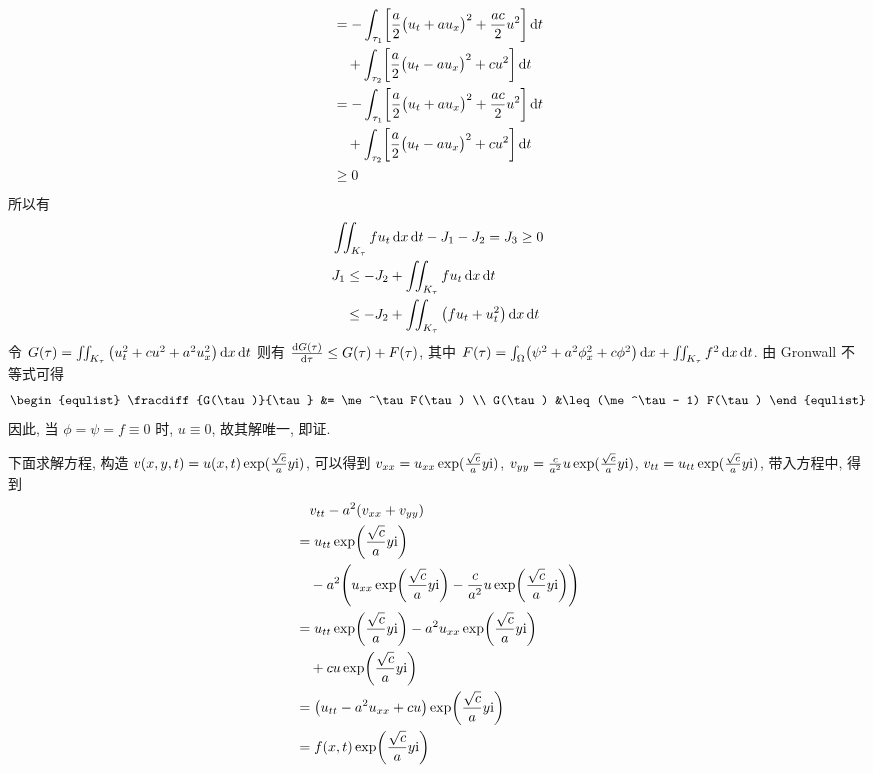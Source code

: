 \begin{solution}
\begin{align*}
&= -\int_{\tau_1} \biggl[ \frac{a}{2}
    \bigl( u_t + a u_x \bigr)^2 + \frac{ac}{2}u^2 \biggr] \operatorname{d\!} t \\
    &\quad+ \int_{\tau_2} \biggl[ \frac{a}{2}
        \bigl( u_t - a u_x \bigr)^2 + cu^2 \biggr] \operatorname{d\!} t \\
&= -\int_{\tau_1} \biggl[ \frac{a}{2}
    \bigl( u_t + a u_x \bigr)^2 + \frac{ac}{2}u^2 \biggr] \operatorname{d\!} t \\
    &\quad+ \int_{\tau_2} \biggl[ \frac{a}{2}
        \bigl( u_t - a u_x \bigr)^2 + cu^2 \biggr] \operatorname{d\!} t \\
&\geq 0
\end{align*}
所以有
\begin{align*}
& \iint_{K_\tau} f u_t \operatorname{d\!} x \operatorname{d\!} t - J_1 - J_2 = J_3 \geq 0 \\
& J_1 \leq -J_2 + \iint_{K_\tau} f u_t \operatorname{d\!} x \operatorname{d\!} t \\
&\quad\leq -J_2 + \iint_{K_\tau} {\left( {f u_t + u_t^2} \right)} \operatorname{d\!} x \operatorname{d\!} t
\end{align*}
令 $G(\tau) = \iint_{K_\tau}{\left( {u_t^2 + c u^2 + a^2 u_x^2} \right)}\operatorname{d\!} x\operatorname{d\!} t$
则有 ${\frac{\operatorname{d\!} {G(\tau)}}{\operatorname{d\!} {\tau}}} \leq G(\tau) + F(\tau)$, 其中
$F(\tau) = \int_\Omega \bigl( \psi^2 + a^2 \phi_x^2 + c\phi^2 \bigr) \operatorname{d\!} x
+\iint_{K_\tau} f^2 \operatorname{d\!} x \operatorname{d\!} t$.
由 Gronwall 不等式可得
\[ \begin{equlist}
\fracdiff{G(\tau)}{\tau} &= \me^\tau F(\tau) \\
    G(\tau) &\leq (\me^\tau - 1) F(\tau)
\end{equlist} \]
因此, 当 $\phi = \psi = f \equiv 0$ 时, $u \equiv 0$, 故其解唯一, 即证.

下面求解方程, 构造 $v(x, y, t) = u(x, t) \* \exp(\frac{\sqrt{c}}{a}y\mi)$,
可以得到 $v_{xx} = u_{xx} \* \exp(\frac{\sqrt{c}}{a}y\mi)$,
$v_{yy} = \frac{c}{a^2} u \* \exp(\frac{\sqrt{c}}{a}y\mi)$,
$v_{tt} = u_{tt} \* \exp(\frac{\sqrt{c}}{a}y\mi)$, 带入方程中, 得到
\begin{align*}
&\quad v_{tt} - a^2 (v_{xx} + v_{yy}) \\
&= u_{tt} \* \exp\biggl(\frac{\sqrt{c}}{a}y\mi\biggr) \\
    &\quad- a^2 \Biggl(
        u_{xx} \* \exp\biggl(\frac{\sqrt{c}}{a}y\mi\biggr)
        - \frac{c}{a^2} \* u \* \exp\biggl(\frac{\sqrt{c}}{a}y\mi\biggr)
    \Biggr) \\
&= u_{tt} \* \exp\biggl(\frac{\sqrt{c}}{a}y\mi\biggr)
    - a^2 u_{xx} \* \exp\biggl(\frac{\sqrt{c}}{a}y\mi\biggr) \\
    &\quad+ c u \* \exp\biggl(\frac{\sqrt{c}}{a}y\mi\biggr) \\
&= \mclosure{u_{tt} - a^2 u_{xx} + cu}
    \* \exp\biggl(\frac{\sqrt{c}}{a}y\mi\biggr) \\
&= f(x, t) \* \exp\biggl(\frac{\sqrt{c}}{a}y\mi\biggr)
\end{align*}


\end{solution}
